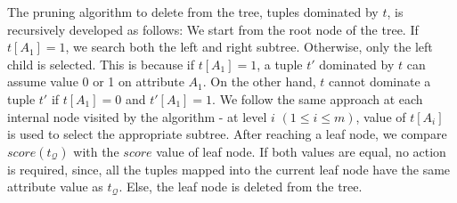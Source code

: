 
\vspace{1mm}
 The pruning algorithm to delete from the tree, tuples dominated by $t$, is recursively developed as follows: We start from the root node of the tree. If $t[A_1] = 1$, we search both the left and right subtree. Otherwise, only the left child is selected. This is because if $t[A_1] = 1$, a tuple $t'$ dominated by $t$ can assume value  0 or 1 on attribute $A_1$. On the other hand, $t$ cannot dominate a tuple $t'$ if $t[A_1] = 0$ and $t'[A_1] = 1$. We follow the same approach at each internal node visited by the algorithm - at level $i$ $(1 \leq i \leq m)$, value of $t[A_i]$ is used to select the appropriate subtree. After reaching a leaf node, we compare $score(t_{\mathcal{Q}})$ with the $score$ value of leaf node. If both values are equal, no action is required, since, all the tuples mapped into the current leaf node have the same attribute value as $t_{\mathcal{Q}}$. Else, the leaf node is deleted from the tree. 


